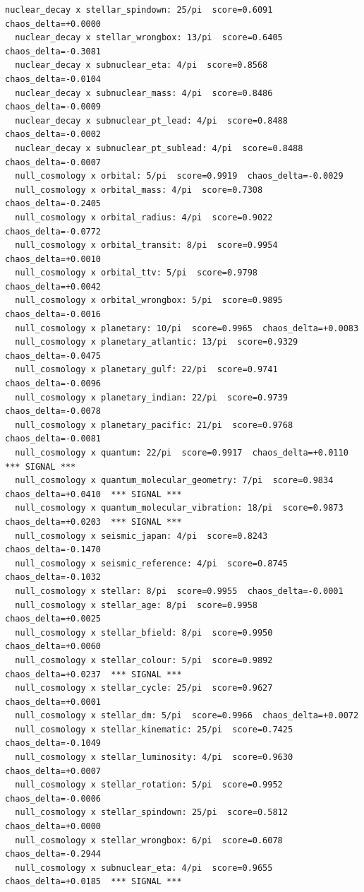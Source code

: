 \documentclass[11pt, letterpaper, openany]{book}
\begin{document}
\begin{empiricalbox}
\begin{lstlisting}[style=terminal]
  nuclear_decay x stellar_spindown: 25/pi  score=0.6091  chaos_delta=+0.0000
  nuclear_decay x stellar_wrongbox: 13/pi  score=0.6405  chaos_delta=-0.3081
  nuclear_decay x subnuclear_eta: 4/pi  score=0.8568  chaos_delta=-0.0104
  nuclear_decay x subnuclear_mass: 4/pi  score=0.8486  chaos_delta=-0.0009
  nuclear_decay x subnuclear_pt_lead: 4/pi  score=0.8488  chaos_delta=-0.0002
  nuclear_decay x subnuclear_pt_sublead: 4/pi  score=0.8488  chaos_delta=-0.0007
  null_cosmology x orbital: 5/pi  score=0.9919  chaos_delta=-0.0029
  null_cosmology x orbital_mass: 4/pi  score=0.7308  chaos_delta=-0.2405
  null_cosmology x orbital_radius: 4/pi  score=0.9022  chaos_delta=-0.0772
  null_cosmology x orbital_transit: 8/pi  score=0.9954  chaos_delta=+0.0010
  null_cosmology x orbital_ttv: 5/pi  score=0.9798  chaos_delta=+0.0042
  null_cosmology x orbital_wrongbox: 5/pi  score=0.9895  chaos_delta=-0.0016
  null_cosmology x planetary: 10/pi  score=0.9965  chaos_delta=+0.0083
  null_cosmology x planetary_atlantic: 13/pi  score=0.9329  chaos_delta=-0.0475
  null_cosmology x planetary_gulf: 22/pi  score=0.9741  chaos_delta=-0.0096
  null_cosmology x planetary_indian: 22/pi  score=0.9739  chaos_delta=-0.0078
  null_cosmology x planetary_pacific: 21/pi  score=0.9768  chaos_delta=-0.0081
  null_cosmology x quantum: 22/pi  score=0.9917  chaos_delta=+0.0110  *** SIGNAL ***
  null_cosmology x quantum_molecular_geometry: 7/pi  score=0.9834  chaos_delta=+0.0410  *** SIGNAL ***
  null_cosmology x quantum_molecular_vibration: 18/pi  score=0.9873  chaos_delta=+0.0203  *** SIGNAL ***
  null_cosmology x seismic_japan: 4/pi  score=0.8243  chaos_delta=-0.1470
  null_cosmology x seismic_reference: 4/pi  score=0.8745  chaos_delta=-0.1032
  null_cosmology x stellar: 8/pi  score=0.9955  chaos_delta=-0.0001
  null_cosmology x stellar_age: 8/pi  score=0.9958  chaos_delta=+0.0025
  null_cosmology x stellar_bfield: 8/pi  score=0.9950  chaos_delta=+0.0060
  null_cosmology x stellar_colour: 5/pi  score=0.9892  chaos_delta=+0.0237  *** SIGNAL ***
  null_cosmology x stellar_cycle: 25/pi  score=0.9627  chaos_delta=+0.0001
  null_cosmology x stellar_dm: 5/pi  score=0.9966  chaos_delta=+0.0072
  null_cosmology x stellar_kinematic: 25/pi  score=0.7425  chaos_delta=-0.1049
  null_cosmology x stellar_luminosity: 4/pi  score=0.9630  chaos_delta=+0.0007
  null_cosmology x stellar_rotation: 5/pi  score=0.9952  chaos_delta=-0.0006
  null_cosmology x stellar_spindown: 25/pi  score=0.5812  chaos_delta=+0.0000
  null_cosmology x stellar_wrongbox: 6/pi  score=0.6078  chaos_delta=-0.2944
  null_cosmology x subnuclear_eta: 4/pi  score=0.9655  chaos_delta=+0.0185  *** SIGNAL ***

\end{lstlisting}
\end{empiricalbox}
\end{document}
